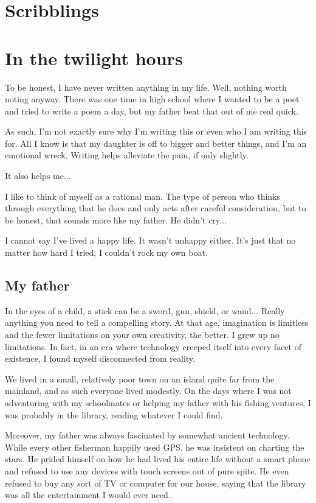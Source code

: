 \chapter{Scribblings}

\chapter{In the twilight hours}

To be honest, I have never written anything in my life.
Well, nothing worth noting anyway.
There was one time in high school where I wanted to be a poet and tried to write a poem a day, but my father beat that out of me real quick.

As such, I'm not exactly sure why I'm writing this or even who I am writing this for.
All I know is that my daughter is off to bigger and better things, and I'm an emotional wreck.
Writing helps alleviate the pain, if only slightly.

It also helps me...

I like to think of myself as a rational man.
The type of person who thinks through everything that he does and only acts after careful consideration, but to be honest, that sounds more like my father.
He didn't cry...


I cannot say I've lived a happy life.
It wasn't unhappy either.
It's just that no matter how hard I tried, I couldn't rock my own boat.


\section{My father}

In the eyes of a child, a stick can be a sword, gun, shield, or wand... Really anything you need to tell a compelling story.
At that age, imagination is limitless and the fewer limitations on your own creativity, the better.
I grew up no limitations.
In fact, in an era where technology creeped itself into every facet of existence, I found myself disconnected from reality.

We lived in a small, relatively poor town on an island quite far from the mainland, and as such everyone lived modestly.
On the days where I was not adventuring with my schoolmates or helping my father with his fishing ventures, I was probably in the library, reading whatever I could find.

Moreover, my father was always fascinated by somewhat ancient technology.
While every other fisherman happily used GPS, he was insistent on charting the stars.
He prided himself on how he had lived his entire life without a smart phone and refused to use any devices with touch screens out of pure spite.
He even refused to buy any sort of TV or computer for our house, saying that the library was all the entertainment I would ever need.



